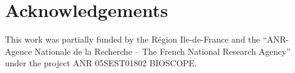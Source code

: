 \documentclass[12pt]{article}
\begin{document}
\section*{Acknowledgements}
This work was partially funded by the R\'egion Ile-de-France and the
“ANR-Agence Nationale de la Recherche – The French National Research
Agency” under the project ANR 05SEST01802 BIOSCOPE.


\clearpage
\newpage



\end{document}
